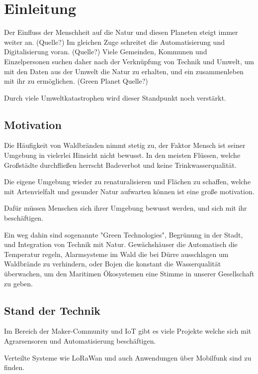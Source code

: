 \section{Einleitung}

Der Einfluss der Menschheit auf die Natur und diesen Planeten steigt immer weiter an.
(Quelle?)
Im gleichen Zuge schreitet die Automatisierung und Digitalisierung voran.
(Quelle?)
Viele Gemeinden, Kommunen und Einzelpersonen suchen daher nach der Verknüpfung von Technik und Umwelt, um mit den Daten aus der Umwelt die Natur zu erhalten, und ein zusammenleben mit ihr zu ermöglichen. (Green Planet Quelle?)

Durch viele Umweltkatastrophen wird dieser Standpunkt noch verstärkt.

\subsection{Motivation}

Die Häufigkeit von Waldbränden nimmt stetig zu, der Faktor Mensch ist seiner Umgebung in vielerlei Hinsicht nicht bewusst.
In den meisten Flüssen, welche Großstädte durchfließen herrscht Badeverbot und keine Trinkwasserqualität.

Die eigene Umgebung wieder zu renaturalisieren und Flächen zu schaffen, welche mit Artenvielfalt und gesunder Natur aufwarten können ist eine große motivation.

Dafür müssen Menschen sich ihrer Umgebung bewusst werden, und sich mit ihr beschäftigen.

Ein weg dahin sind sogenannte "Green Technologies", Begrünung in der Stadt, und Integration von Technik mit Natur.
Gewächshäuser die Automatisch die Temperatur regeln, Alarmsysteme im Wald die bei Dürre ausschlagen um Waldbrände zu verhindern, oder Bojen die konstant die Wasserqualität überwachen, um den Maritimen Ökosystemen eine Stimme in unserer Gesellschaft zu geben.





\subsection{Stand der Technik}

Im Bereich der Maker-Community und IoT gibt es viele Projekte welche sich mit Agrarsensoren und Automatisierung beschäftigen.

Verteilte Systeme wie LoRaWan und auch Anwendungen über Mobilfunk sind zu finden.

